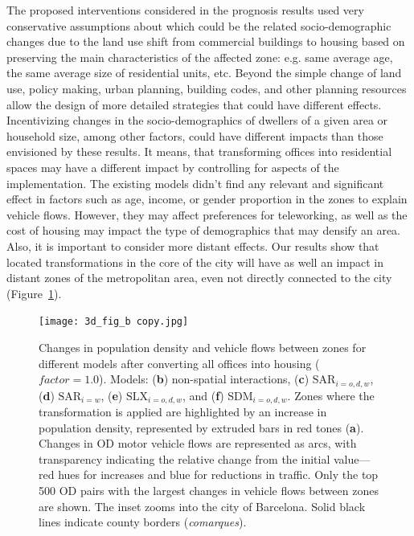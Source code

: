 The proposed interventions considered in the prognosis results used very conservative assumptions about which could be the related socio-demographic changes due to the land use shift from commercial buildings to housing based on preserving the main characteristics of the affected zone: e.g. same average age, the same average size of residential units, etc. Beyond the simple change of land use, policy making, urban planning, building codes, and other planning resources allow the design of more detailed strategies that could have different effects. Incentivizing changes in the socio-demographics of dwellers of a given area or household size, among other factors, could have different impacts than those envisioned by these results. It means, that transforming offices into residential spaces may have a different impact by controlling for aspects of the implementation. The existing models didn't find any relevant and significant effect in factors such as age, income, or gender proportion in the zones to explain vehicle flows. However, they may affect preferences for teleworking, as well as the cost of housing may impact the type of demographics that may densify an area. Also, it is important to consider more distant effects. Our results show that located transformations in the core of the city will have as well an impact in distant zones of the metropolitan area, even not directly connected to the city (Figure~\ref{fig:3d}).

\begin{figure}[h!]
    \centering
    \texttt{[image: 3d\_fig\_b copy.jpg]}
    \caption{Changes in population density and vehicle flows between zones for different models after converting all offices into housing ($\mathit{factor}=1.0$). Models: (\textbf{b}) non-spatial interactions, (\textbf{c}) $\text{SAR}_{i=o,d,w}$, (\textbf{d}) $\text{SAR}_{i=w}$, (\textbf{e}) $\text{SLX}_{i=o,d,w}$, and (\textbf{f}) $\text{SDM}_{i=o,d,w}$. Zones where the transformation is applied are highlighted by an increase in population density, represented by extruded bars in red tones (\textbf{a}). Changes in OD motor vehicle flows are represented as arcs, with transparency indicating the relative change from the initial value—red hues for increases and blue for reductions in traffic. Only the top 500 OD pairs with the largest changes in vehicle flows between zones are shown. The inset zooms into the city of Barcelona. Solid black lines indicate county borders (\textit{comarques}).}
    \label{fig:3d}
\end{figure}

